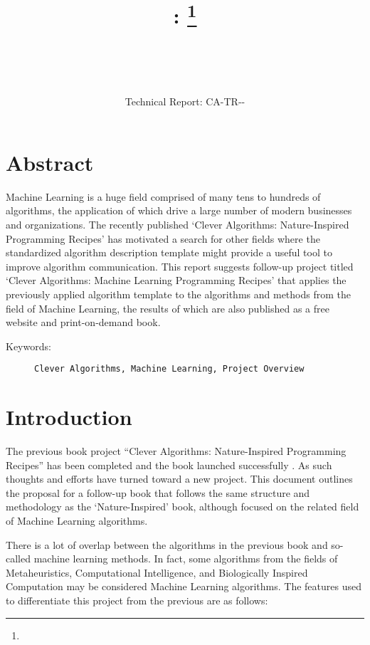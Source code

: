 \documentclass[a4paper, 11pt]{article}
\title{{\myreporttitle}: {\myreportsubtitle}\footnote{\myreportlicense}}
\author{\myreportauthor\\{\myreportemail}\\\small\myreportproject}
\date{\myreportfulldate\\{\small{Technical Report: CA-TR-{\myreportdate}-\myreportversion}}}
\begin{document}
\maketitle

\section*{Abstract} 
Machine Learning is a huge field comprised of many tens to hundreds of algorithms, the application of which drive a large number of modern businesses and organizations.
The recently published `Clever Algorithms: Nature-Inspired Programming Recipes' has motivated a search for other fields where the standardized algorithm description template might provide a useful tool to improve algorithm communication.
This report suggests follow-up project titled `Clever Algorithms: Machine Learning Programming Recipes' that applies the previously applied algorithm template to the algorithms and methods from the field of Machine Learning, the results of which are also published as a free website and print-on-demand book.

\begin{description}
	\item[Keywords:] {\small\texttt{Clever Algorithms, Machine Learning, Project Overview}}
\end{description} 

\section{Introduction}
\label{sec:introduction}
The previous book project ``Clever Algorithms: Nature-Inspired Programming Recipes'' has been completed and the book launched successfully \cite{Brownlee2011}. As such thoughts and efforts have turned toward a new project. This document outlines the proposal for a follow-up book that follows the same structure and methodology as the `Nature-Inspired' book, although focused on the related field of Machine Learning algorithms.

There is a lot of overlap between the algorithms in the previous book and so-called machine learning methods. In fact, some algorithms from the fields of Metaheuristics, Computational Intelligence, and Biologically Inspired Computation may be considered Machine Learning algorithms. The features used to differentiate this project from the previous are as follows:
\end{document}
